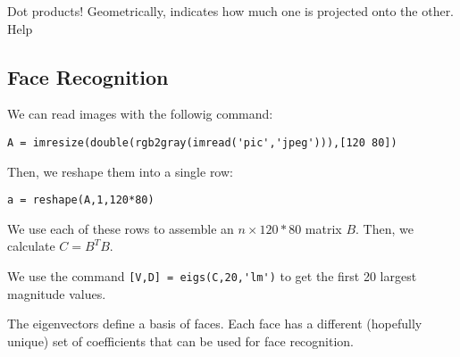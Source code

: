 Dot products! Geometrically, indicates how much one is projected onto the other. Help

\subsection{Face Recognition}

We can read images with the followig command:

\verb!A = imresize(double(rgb2gray(imread('pic','jpeg'))),[120 80])!

Then, we reshape them into a single row:

\verb!a = reshape(A,1,120*80)!

We use each of these rows to assemble an $n \times 120*80$ matrix $B$. Then, we calculate $C = B^T B$.

We use the command \verb![V,D] = eigs(C,20,'lm')! to get the first 20 largest magnitude values.

The eigenvectors define a basis of faces. Each face has a different (hopefully unique) set of coefficients that can be used for face recognition.
